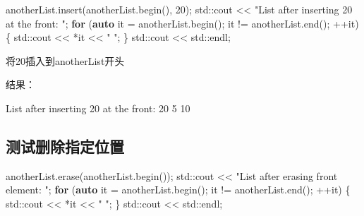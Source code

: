 \documentclass[
]{article}
\newenvironment{Shaded}{}{}
\newcommand{\BuiltInTok}[1]{\textcolor[rgb]{0.00,0.50,0.00}{#1}}
\newcommand{\ControlFlowTok}[1]{\textcolor[rgb]{0.00,0.44,0.13}{\textbf{#1}}}
\newcommand{\DecValTok}[1]{\textcolor[rgb]{0.25,0.63,0.44}{#1}}
\newcommand{\KeywordTok}[1]{\textcolor[rgb]{0.00,0.44,0.13}{\textbf{#1}}}
\newcommand{\NormalTok}[1]{#1}
\newcommand{\OperatorTok}[1]{\textcolor[rgb]{0.40,0.40,0.40}{#1}}
\newcommand{\StringTok}[1]{\textcolor[rgb]{0.25,0.44,0.63}{#1}}
\begin{document}
\begin{Shaded}
\begin{Highlighting}[]
\NormalTok{anotherList}\OperatorTok{.}\NormalTok{insert}\OperatorTok{(}\NormalTok{anotherList}\OperatorTok{.}\NormalTok{begin}\OperatorTok{(),} \DecValTok{20}\OperatorTok{);}
\BuiltInTok{std::}\NormalTok{cout}\OperatorTok{ \textless{}\textless{}} \StringTok{"List after inserting 20 at the front: "}\OperatorTok{;}
\ControlFlowTok{for} \OperatorTok{(}\KeywordTok{auto}\NormalTok{ it }\OperatorTok{=}\NormalTok{ anotherList}\OperatorTok{.}\NormalTok{begin}\OperatorTok{();}\NormalTok{ it }\OperatorTok{!=}\NormalTok{ anotherList}\OperatorTok{.}\NormalTok{end}\OperatorTok{();} \OperatorTok{++}\NormalTok{it}\OperatorTok{)} \OperatorTok{\{}
    \BuiltInTok{std::}\NormalTok{cout}\OperatorTok{ \textless{}\textless{}} \OperatorTok{*}\NormalTok{it }\OperatorTok{\textless{}\textless{}} \StringTok{" "}\OperatorTok{;}
\OperatorTok{\}}
\BuiltInTok{std::}\NormalTok{cout}\OperatorTok{ \textless{}\textless{}} \BuiltInTok{std::}\NormalTok{endl}\OperatorTok{;}
\end{Highlighting}
\end{Shaded}

将20插入到anotherList开头

结果：

\begin{Shaded}
\begin{Highlighting}[]
\NormalTok{List after inserting 20 at the front: 20 5 10}
\end{Highlighting}
\end{Shaded}

\hypertarget{ux6d4bux8bd5ux5220ux9664ux6307ux5b9aux4f4dux7f6e}{%
\subsection{测试删除指定位置}\label{ux6d4bux8bd5ux5220ux9664ux6307ux5b9aux4f4dux7f6e}}

\begin{Shaded}
\begin{Highlighting}[]
\NormalTok{anotherList}\OperatorTok{.}\NormalTok{erase}\OperatorTok{(}\NormalTok{anotherList}\OperatorTok{.}\NormalTok{begin}\OperatorTok{());}
\BuiltInTok{std::}\NormalTok{cout}\OperatorTok{ \textless{}\textless{}} \StringTok{"List after erasing front element: "}\OperatorTok{;}
\ControlFlowTok{for} \OperatorTok{(}\KeywordTok{auto}\NormalTok{ it }\OperatorTok{=}\NormalTok{ anotherList}\OperatorTok{.}\NormalTok{begin}\OperatorTok{();}\NormalTok{ it }\OperatorTok{!=}\NormalTok{ anotherList}\OperatorTok{.}\NormalTok{end}\OperatorTok{();} \OperatorTok{++}\NormalTok{it}\OperatorTok{)} \OperatorTok{\{}
    \BuiltInTok{std::}\NormalTok{cout}\OperatorTok{ \textless{}\textless{}} \OperatorTok{*}\NormalTok{it }\OperatorTok{\textless{}\textless{}} \StringTok{" "}\OperatorTok{;}
\OperatorTok{\}}
\BuiltInTok{std::}\NormalTok{cout}\OperatorTok{ \textless{}\textless{}} \BuiltInTok{std::}\NormalTok{endl}\OperatorTok{;}
\end{Highlighting}
\end{Shaded}
\end{document}
